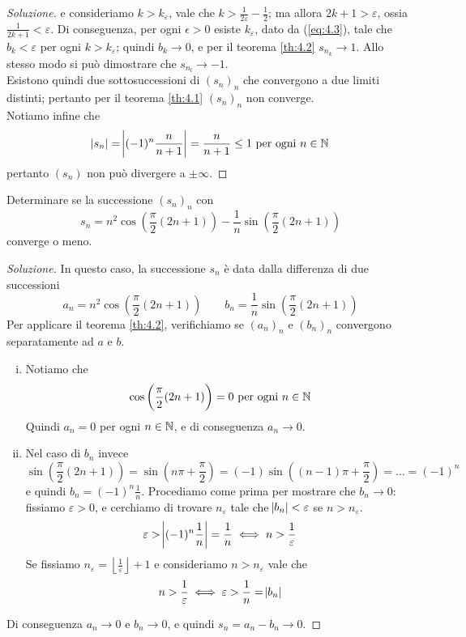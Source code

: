 \begin{proof}[Soluzione]
    e consideriamo $k>k_\varepsilon$, vale che $k>\frac{1}{2\varepsilon}-\frac{1}{2}$; ma allora $2k+1 >\varepsilon$, ossia $\frac{1}{2k+1}<\varepsilon$. Di conseguenza, per ogni $\epsilon>0$ esiste $k_\varepsilon$, dato da (\ref{eq:4.3}), tale che $b_k<\varepsilon$ per ogni $k>k_\varepsilon$; quindi $b_k\to 0$, e per il teorema \ref{th:4.2} $s_{n_k}\to 1$. Allo stesso modo si può dimostrare che $s_{n_l}\to -1$.\\
    Esistono quindi due sottosuccessioni di $(s_n)_n$ che convergono a due limiti distinti; pertanto per il teorema \ref{th:4.1} $(s_n)_n$ non converge.\\
    Notiamo infine che 
    \[
    \abs{s_n} = \abs{(-1)^n \frac{n}{n+1}} = \frac{n}{n+1}\le 1 \ \text{per ogni} \ n\in\amsbb{N}
    \]
    pertanto $(s_n)$ non può divergere a $\pm \infty$.
\end{proof}
\begin{exercise}
    \label{ex:4.2}
    Determinare se la successione $(s_n)_n$ con
    \[
    s_n = n^2\cos\left(\frac{\pi}{2}(2n+1)\right)-\frac{1}{n}\sin\left(\frac{\pi}{2}(2n+1)\right)
    \]
    converge o meno.
\end{exercise}
\begin{proof}[Soluzione]
    In questo caso, la successione $s_n$ è data dalla differenza di due successioni 
    \[
    {a_n = n^2 \cos\left(\frac{\pi}{2}(2n+1)\right)}\qquad {b_n = \frac{1}{n}\sin\left(\frac{\pi}{2}(2n+1)\right)}
    \]
    Per applicare il teorema \ref{th:4.2}, verifichiamo se $(a_n)_n$ e $(b_n)_n$ convergono separatamente ad $a$ e $b$.
    \begin{enumerate}[(i)]
        \item Notiamo che 
        \[
        \cos\left(\frac{\pi}{2}(2n+1)\right) = 0 \ \text{per ogni} \ n\in\amsbb{N}
        \]
        Quindi $a_n = 0$ per ogni $n\in\amsbb{N}$, e di conseguenza $a_n \to 0$.
        \item Nel caso di $b_n$ invece
        \[
            \sin\left(\frac{\pi}{2}(2n+1)\right) = \sin\left(n\pi + \frac{\pi}{2}\right) = (-1)\sin\left((n-1)\pi + \frac{\pi}{2}\right) = \dots = (-1)^n
        \]
        e quindi $b_n = (-1)^n \frac{1}{n}$. Procediamo come prima per mostrare che $b_n\to 0$: fissiamo $\varepsilon>0$, e cerchiamo di trovare $n_\varepsilon$ tale che $\abs{b_n}<\varepsilon $ se $n>n_\varepsilon$.
        \[
        \varepsilon> \abs{(-1)^n\frac{1}{n}} = \frac{1}{n} \iff n > \frac{1}{\varepsilon}
        \]
        Se fissiamo $n_\varepsilon = \left \lfloor \frac{1}{\varepsilon} \right \rfloor+1$ e consideriamo $n>n_\varepsilon$ vale che 
        \[
        n>\frac{1}{\varepsilon} \iff \varepsilon>\frac{1}{n} = \abs{b_n}
        \]
    \end{enumerate}
    Di conseguenza $a_n \to 0 $ e $b_n \to 0$, e quindi $s_n = a_n - b_n \to 0$.
\end{proof}
